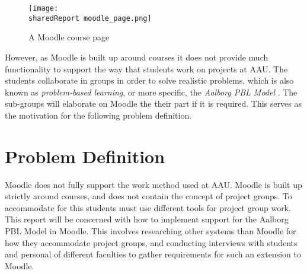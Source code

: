 \begin{figure}
\texttt{[image: \\sharedReport moodle\_page.png]}
\caption{A Moodle course page}
\label{fig:MoodleCourse}
\end{figure}

However, as Moodle is built up around courses it does not provide much functionality to support the way that students work on projects at AAU. 
The students collaborate in groups in order to solve realistic problems, which is also known as \emph{problem-based learning}, or more specific, the \emph{Aalborg PBL Model} \citep{pbl}. The sub-groups will elaborate on Moodle the their part if it is required.
 This serves as the motivation for the following problem definition.

\section{Problem Definition}
\label{sec:problemDef}
Moodle does not fully support the work method used at AAU. 
Moodle is built up strictly around courses, and does not contain the concept of project groups. 
To accommodate for this students must use different tools for project group work.
This report will be concerned with how to implement support for the Aalborg PBL Model in Moodle. 
This involves researching other systems than Moodle for how they accommodate project groups, and conducting interviews with students and personal of different faculties to gather requirements for such an extension to Moodle.
